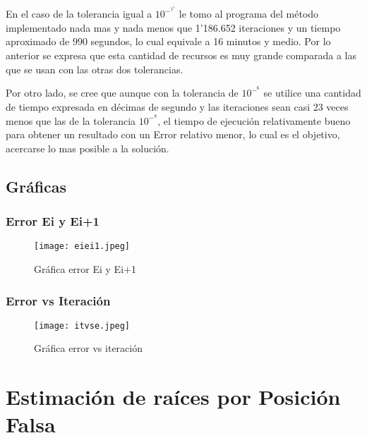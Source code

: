 \documentclass{article}
\begin{document}
En el caso de la tolerancia igual a \(10^-^1^1\) le tomo al programa del método implementado nada mas y nada menos que 1'186.652 iteraciones y un tiempo aproximado de 990 segundos, lo cual equivale a 16 minutos y medio. Por lo anterior se expresa que esta cantidad de recursos es muy grande comparada a las que se usan con las otras dos tolerancias.

Por otro lado, se cree que aunque con la tolerancia de \(10^-^6\) se utilice una cantidad de tiempo expresada en décimas de segundo y las iteraciones sean casi 23 veces menos que las de la tolerancia \(10^-^8\), el tiempo de ejecución relativamente bueno para obtener un resultado con un Error relativo menor, lo cual es el objetivo, acercarse lo mas posible a la solución.  
\subsection{Gráficas}
\subsubsection{Error Ei y Ei+1}
\begin{figure}[H]
    \centering
    \texttt{[image: eiei1.jpeg]}
    \caption{Gráfica error Ei y Ei+1}
    \label{fig:eiei1}
\end{figure}
\subsubsection{Error vs Iteración}
\begin{figure}[H]
    \centering
    \texttt{[image: itvse.jpeg]}
    \caption{Gráfica error vs iteración}
    \label{fig:itvse}
\end{figure}

\section{Estimación de raíces por Posición Falsa}
\end{document}
